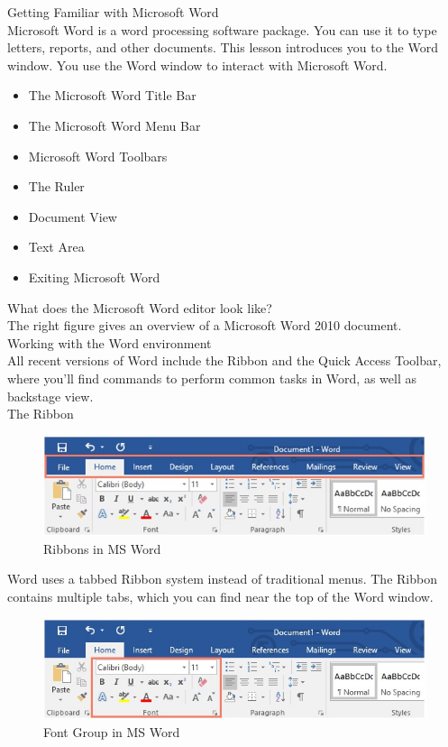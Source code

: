 \documentclass[11pt,a4paper,twoside]{article}
\begin{document}
Getting Familiar with Microsoft Word\\
Microsoft Word is a word processing software package. You can use it to type letters, reports, and other documents. This lesson introduces you to the Word window. You use the Word window to interact with Microsoft Word.
\begin{itemize}
    \item The Microsoft Word Title Bar
\item The Microsoft Word Menu Bar
\item Microsoft Word Toolbars
\item The Ruler
\item Document View 
\item Text Area 
\item Exiting Microsoft Word 
\end{itemize}
What does the Microsoft Word editor look like? \\
The right figure gives an overview of a Microsoft Word 2010 document.	\\
Working with the Word environment\\
All recent versions of Word include the Ribbon and the Quick Access Toolbar, where you'll find commands to perform common tasks in Word, as well as backstage view.\\
The Ribbon
\begin{figure}[H]
\includegraphics[width=1\textwidth]{Fig 24.jpg}
\caption{Ribbons in MS Word}
\end{figure}
Word uses a tabbed Ribbon system instead of traditional menus. The Ribbon contains multiple tabs, which you can find near the top of the Word window.
\begin{figure}[H]
\includegraphics[width=1\textwidth]{Fig 25.jpg}
\caption{Font Group in MS Word}
\end{figure}
\end{document}
